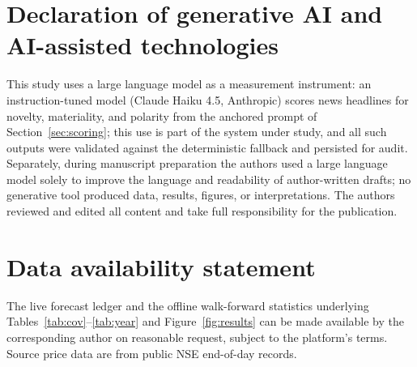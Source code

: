 \documentclass{elektr}
\begin{document}
\section*{Declaration of generative AI and AI-assisted technologies}
This study uses a large language model as a measurement instrument: an instruction-tuned model (Claude Haiku 4.5, Anthropic) scores news headlines for novelty, materiality, and polarity from the anchored prompt of Section~\ref{sec:scoring}; this use is part of the system under study, and all such outputs were validated against the deterministic fallback and persisted for audit. Separately, during manuscript preparation the authors used a large language model solely to improve the language and readability of author-written drafts; no generative tool produced data, results, figures, or interpretations. The authors reviewed and edited all content and take full responsibility for the publication.

\section*{Data availability statement}
The live forecast ledger and the offline walk-forward statistics underlying Tables~\ref{tab:cov}--\ref{tab:year} and Figure~\ref{fig:results} can be made available by the corresponding author on reasonable request, subject to the platform's terms. Source price data are from public NSE end-of-day records.
\end{document}
